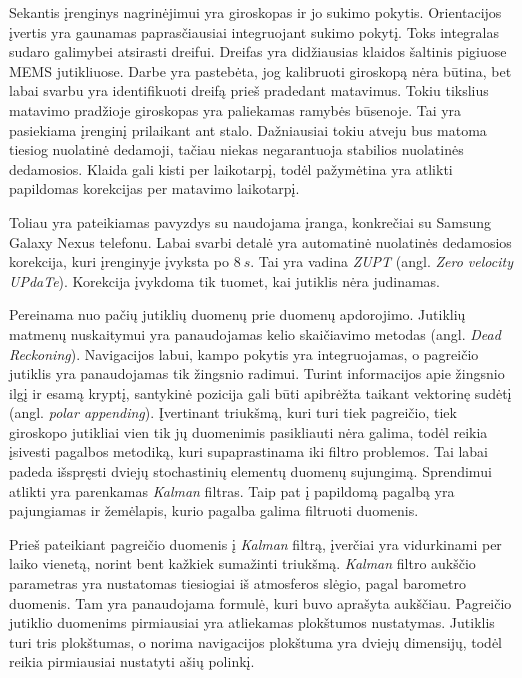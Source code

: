 Sekantis įrenginys nagrinėjimui yra giroskopas ir jo sukimo pokytis. Orientacijos įvertis yra gaunamas paprasčiausiai integruojant sukimo pokytį. Toks integralas sudaro galimybei atsirasti dreifui. Dreifas yra didžiausias klaidos šaltinis pigiuose MEMS jutikliuose. Darbe yra pastebėta, jog kalibruoti giroskopą nėra būtina, bet labai svarbu yra identifikuoti dreifą prieš pradedant matavimus. Tokiu tikslius matavimo pradžioje giroskopas yra paliekamas ramybės būsenoje. Tai yra pasiekiama įrenginį prilaikant ant stalo. Dažniausiai tokiu atveju bus matoma tiesiog nuolatinė dedamoji, tačiau niekas negarantuoja stabilios nuolatinės dedamosios. Klaida gali kisti per laikotarpį, todėl pažymėtina yra atlikti papildomas korekcijas per matavimo laikotarpį.

Toliau yra pateikiamas pavyzdys su naudojama įranga, konkrečiai su Samsung Galaxy Nexus telefonu. Labai svarbi detalė yra automatinė nuolatinės dedamosios korekcija, kuri įrenginyje įvyksta po $8~s$. Tai yra vadina \textit{ZUPT} (angl. \textit{Zero velocity UPdaTe}). Korekcija įvykdoma tik tuomet, kai jutiklis nėra judinamas.

Pereinama nuo pačių jutiklių duomenų prie duomenų apdorojimo. Jutiklių matmenų nuskaitymui yra panaudojamas kelio skaičiavimo metodas (angl. \textit{Dead Reckoning}). Navigacijos labui, kampo pokytis yra integruojamas, o pagreičio jutiklis yra panaudojamas tik žingsnio radimui. Turint informacijos apie žingsnio ilgį ir esamą kryptį, santykinė pozicija gali būti apibrėžta taikant vektorinę sudėtį (angl. \textit{polar appending}). Įvertinant triukšmą, kuri turi tiek pagreičio, tiek giroskopo jutikliai vien tik jų duomenimis pasikliauti nėra galima, todėl reikia įsivesti pagalbos metodiką, kuri supaprastinama iki filtro problemos. Tai labai padeda išspręsti dviejų stochastinių elementų duomenų sujungimą. Sprendimui atlikti yra parenkamas \textit{Kalman} filtras. Taip pat į papildomą pagalbą yra pajungiamas ir žemėlapis, kurio pagalba galima filtruoti duomenis.

Prieš pateikiant pagreičio duomenis į \textit{Kalman} filtrą, įverčiai yra vidurkinami per laiko vienetą, norint bent kažkiek sumažinti triukšmą. \textit{Kalman} filtro aukščio parametras yra nustatomas tiesiogiai iš atmosferos slėgio, pagal barometro duomenis. Tam yra panaudojama formulė, kuri buvo aprašyta aukščiau. Pagreičio jutiklio duomenims pirmiausiai yra atliekamas plokštumos nustatymas. Jutiklis turi tris plokštumas, o norima navigacijos plokštuma yra dviejų dimensijų, todėl reikia pirmiausiai nustatyti ašių polinkį.


